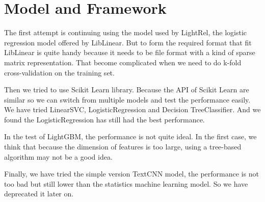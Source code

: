 \section{Model and Framework}
\label{sec:model_and_framework}

The first attempt is continuing using the model used by LightRel, the logistic regression model offered by LibLinear. But to form the required format that fit LibLinear is quite handy because it needs to be file format with a kind of sparse matrix representation. That become complicated when we need to do k-fold cross-validation on the training set.

Then we tried to use Scikit Learn library. Because the API of Scikit Learn are similar so we can switch from multiple models and test the performance easily. We have tried LinearSVC, LogisticRegression and Decision TreeClassifier. And we found the LogisticRegression has still had the best performance.

In the test of LightGBM, the performance is not quite ideal. In the first case, we think that because the dimension of features is too large, using a tree-based algorithm may not be a good idea.

Finally, we have tried the simple version TextCNN model, the performance is not too bad but still lower than the statistics machine learning model. So we have deprecated it later on.